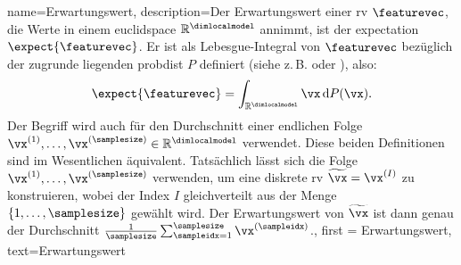 {{
{
	name=Erwartungswert,
	description={Der  Erwartungswert einer \gls{rv} $\featurevec$, 
		die Werte in einem \gls{euclidspace} $\mathbb{R}^{\dimlocalmodel}$ annimmt, ist der 
		\gls{expectation} $\expect\{\featurevec\}$. Er ist als Lebesgue-Integral von 
		$\featurevec$ bezüglich der zugrunde liegenden \gls{probdist} $P$ definiert (siehe z.\,B. \cite{BillingsleyProbMeasure} oder \cite{RudinBookPrinciplesMatheAnalysis}), also:
		\[
		\expect\{\featurevec\} = \int_{\mathbb{R}^{\dimlocalmodel}} \vx \, \mathrm{d}P(\vx).
		\]
		Der Begriff wird auch für den Durchschnitt einer endlichen Folge 
		$\vx^{(1)}, \ldots, \vx^{(\samplesize)} \in \mathbb{R}^{\dimlocalmodel}$ verwendet. 
		Diese beiden Definitionen sind im Wesentlichen äquivalent. Tatsächlich lässt sich 
		die Folge $\vx^{(1)}, \ldots, \vx^{(\samplesize)}$ verwenden, um eine diskrete 
		\gls{rv} $\widetilde{\vx} = \vx^{(I)}$ zu konstruieren, wobei der Index $I$ 
		gleichverteilt aus der Menge $\{1, \ldots, \samplesize\}$ gewählt wird. 
		Der Erwartungswert von $\widetilde{\vx}$ ist dann genau der Durchschnitt 
		$\frac{1}{\samplesize} \sum_{\sampleidx=1}^{\samplesize} \vx^{(\sampleidx)}$.},
	first = {Erwartungswert}, text={Erwartungswert} 
}

}}
